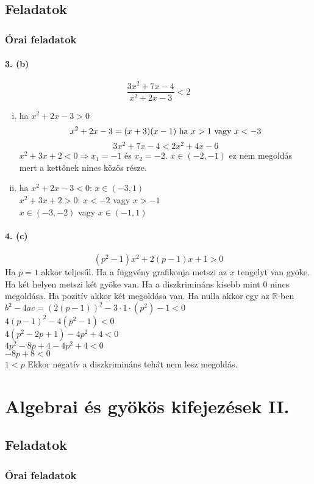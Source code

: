 \documentclass[12pt,a4paper,fleqn]{article}
\newcommand{\myparagraph}[1]{\paragraph{#1}\mbox{}}
\begin{document}
\subsection{Feladatok}
\subsubsection{Órai feladatok}

\myparagraph{3. (b)}
\[ \dfrac{3x^2+7x-4}{x^2+2x-3} < 2 \]
\begin{enumerate}[i.]
  \item ha $x^2+2x-3 > 0$
  \[ x^2+2x-3 = (x+3)(x-1)$ ha $x>1$ vagy $x<-3 \]
  \[ 3x^2+7x-4 < 2x^2+4x-6 \]
  $x^2 + 3x + 2 < 0 \Rightarrow x_1=-1$ és $x_2=-2$. $x \in (-2, -1)$ ez nem megoldás mert a kettőnek nincs közös része.
  \item ha $x^2+2x-3 < 0$: $x \in (-3, 1)$ \\
  $x^2+3x+2 > 0$: $x<-2$ vagy $x>-1$ \\
  $x \in (-3, -2)$ vagy $x \in (-1, 1)$
\end{enumerate}

\myparagraph{4. (c)}
$$ (p^2-1)x^2 + 2(p-1)x + 1 > 0 $$
Ha $p=1$ akkor teljesűl.
Ha a függvény grafikonja metszi az $x$ tengelyt van gyöke. Ha két helyen metszi két gyöke van.
Ha a diszkrimináns kisebb mint 0 nincs megoldása. Ha pozitív akkor két megoldása van. Ha nulla akkor egy az $\mathbb{R}$-ben \\
$b^2-4ac=(2(p-1))^2-3 \cdot 1 \cdot (p^2)-1 < 0$ \\
$ 4(p-1)^2 - 4(p^2 - 1) < 0 $ \\
$ 4(p^2 - 2p + 1) - 4p^2 + 4 < 0 $ \\
$ 4p^2 - 8p + 4 - 4p^2 + 4 < 0 $ \\
$ -8p + 8 < 0 $ \\
$ 1 < p $ Ekkor negatív a diszkrimináns tehát nem lesz megoldás.

\section{Algebrai és gyökös kifejezések II.}
\setcounter{subsection}{1}
\subsection{Feladatok}
\subsubsection{Órai feladatok}
\end{document}

